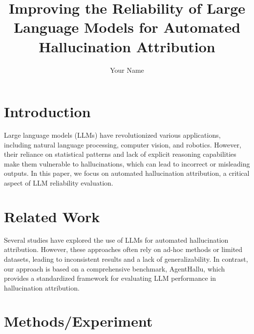 \documentclass{article}
\begin{document}
\title{Improving the Reliability of Large Language Models for Automated Hallucination Attribution}

\author{Your Name}

\maketitle


\section{Introduction}

Large language models (LLMs) have revolutionized various applications, including natural language processing, computer vision, and robotics. However, their reliance on statistical patterns and lack of explicit reasoning capabilities make them vulnerable to hallucinations, which can lead to incorrect or misleading outputs. In this paper, we focus on automated hallucination attribution, a critical aspect of LLM reliability evaluation.

\section{Related Work}

Several studies have explored the use of LLMs for automated hallucination attribution. However, these approaches often rely on ad-hoc methods or limited datasets, leading to inconsistent results and a lack of generalizability. In contrast, our approach is based on a comprehensive benchmark, AgentHallu, which provides a standardized framework for evaluating LLM performance in hallucination attribution.

\section{Methods/Experiment}
\end{document}
